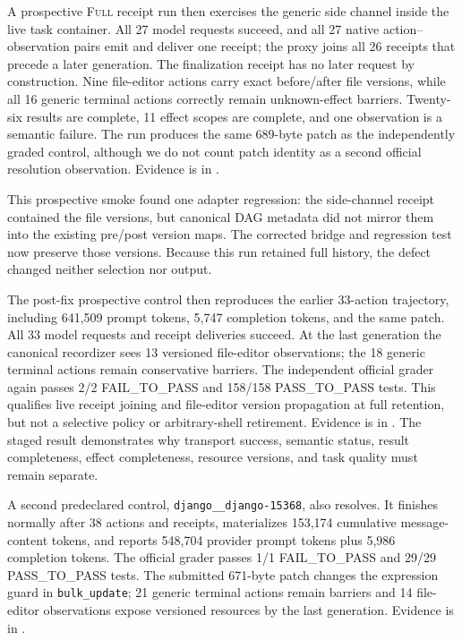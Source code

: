 \documentclass[11pt]{article}
\begin{document}
A prospective \textsc{Full} receipt run then exercises the generic side channel
inside the live task container.  All 27 model requests succeed, and all 27
native action--observation pairs emit and deliver one receipt; the proxy joins
all 26 receipts that precede a later generation.  The finalization receipt has
no later request by construction.  Nine file-editor actions carry exact
before/after file versions, while all 16 generic terminal actions correctly
remain unknown-effect barriers.  Twenty-six results are complete, 11 effect
scopes are complete, and one observation is a semantic failure.  The run
produces the same 689-byte patch as the independently graded control, although
we do not count patch identity as a second official resolution observation.
Evidence is in
.

This prospective smoke found one adapter regression: the side-channel receipt
contained the file versions, but canonical DAG metadata did not mirror them
into the existing pre/post version maps.  The corrected bridge and regression
test now preserve those versions.  Because this run retained full history, the
defect changed neither selection nor output.

The post-fix prospective control then reproduces the earlier 33-action
trajectory, including 641,509 prompt tokens, 5,747 completion tokens, and the
same patch.  All 33 model requests and receipt deliveries succeed.  At the last
generation the canonical recordizer sees 13 versioned file-editor observations;
the 18 generic terminal actions remain conservative barriers.  The independent
official grader again passes 2/2 FAIL\_TO\_PASS and 158/158 PASS\_TO\_PASS tests.
This qualifies live receipt joining and file-editor version propagation at
full retention, but not a selective policy or arbitrary-shell retirement.
Evidence is in
.  The staged
result demonstrates why transport success, semantic status, result completeness,
effect completeness, resource versions, and task quality must remain separate.

A second predeclared control, \texttt{django\_\_django-15368}, also resolves.
It finishes normally after 38 actions and receipts, materializes 153,174
cumulative message-content tokens, and reports 548,704 provider prompt tokens
plus 5,986 completion tokens.  The official grader passes 1/1
FAIL\_TO\_PASS and 29/29 PASS\_TO\_PASS tests.  The submitted 671-byte patch
changes the expression guard in \texttt{bulk\_update}; 21 generic terminal
actions remain barriers and 14 file-editor observations expose versioned
resources by the last generation.  Evidence is in
.
\end{document}
